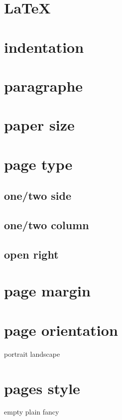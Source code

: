 \section{\LaTeX}

\section{indentation}
\parindent=0cm
\section{paragraphe}



\section{paper size}
\section{page type}
  \subsection{one/two side}
  \subsection{one/two column}
  \subsection{open right}
\section{page margin}
\section{page orientation} portrait landscape
\section{pages style}      empty plain fancy



